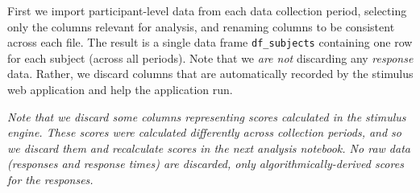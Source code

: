 \documentclass[
  letterpaper,
  DIV=11,
  numbers=noendperiod]{scrreprt}
\begin{document}
First we import participant-level data from each data collection period,
selecting only the columns relevant for analysis, and renaming columns
to be consistent across each file. The result is a single data frame
\texttt{df\_subjects} containing one row for each subject (across all
periods). Note that we \emph{are not} discarding any \emph{response}
data. Rather, we discard columns that are automatically recorded by the
stimulus web application and help the application run.

\emph{Note that we discard some columns representing scores calculated
in the stimulus engine. These scores were calculated differently across
collection periods, and so we discard them and recalculate scores in the
next analysis notebook. No raw data (responses and response times) are
discarded, only algorithmically-derived scores for the responses.}
\end{document}
